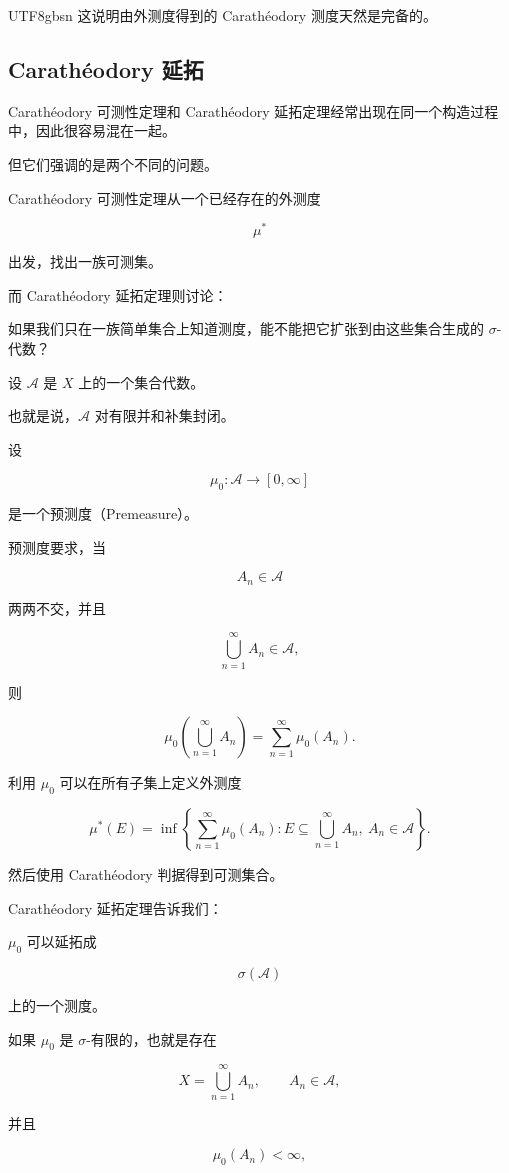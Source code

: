\documentclass[11pt]{article}
\begin{document}
\begin{CJK*}{UTF8}{gbsn}
这说明由外测度得到的 Carathéodory 测度天然是完备的。

\subsection{Carathéodory 延拓}

Carathéodory 可测性定理和 Carathéodory 延拓定理经常出现在同一个构造过程中，因此很容易混在一起。

但它们强调的是两个不同的问题。

Carathéodory 可测性定理从一个已经存在的外测度

\[
\mu^{*}
\]

出发，找出一族可测集。

而 Carathéodory 延拓定理则讨论：

如果我们只在一族简单集合上知道测度，能不能把它扩张到由这些集合生成的 $\sigma$-代数？

设 $\mathcal{A}$ 是 $X$ 上的一个集合代数。

也就是说，$\mathcal{A}$ 对有限并和补集封闭。

设

\[
\mu_{0}:\mathcal{A}\rightarrow[0,\infty]
\]

是一个预测度（Premeasure）。

预测度要求，当

\[
A_{n}\in\mathcal{A}
\]

两两不交，并且

\[
\bigcup_{n=1}^{\infty}A_{n}\in\mathcal{A},
\]

则

\[
\mu_{0}\left(\bigcup_{n=1}^{\infty}A_{n}\right)=\sum_{n=1}^{\infty}\mu_{0}(A_{n}).
\]

利用 $\mu_{0}$ 可以在所有子集上定义外测度

\[
\mu^{*}(E)=\inf\left\{\sum_{n=1}^{\infty}\mu_{0}(A_{n}):E\subseteq\bigcup_{n=1}^{\infty}A_{n},\ A_{n}\in\mathcal{A}\right\}.
\]

然后使用 Carathéodory 判据得到可测集合。

Carathéodory 延拓定理告诉我们：

$\mu_{0}$ 可以延拓成

\[
\sigma(\mathcal{A})
\]

上的一个测度。

如果 $\mu_{0}$ 是 $\sigma$-有限的，也就是存在

\[
X=\bigcup_{n=1}^{\infty}A_{n},\qquad A_{n}\in\mathcal{A},
\]

并且

\[
\mu_{0}(A_{n})<\infty,
\]


\end{CJK*}
\end{document}
